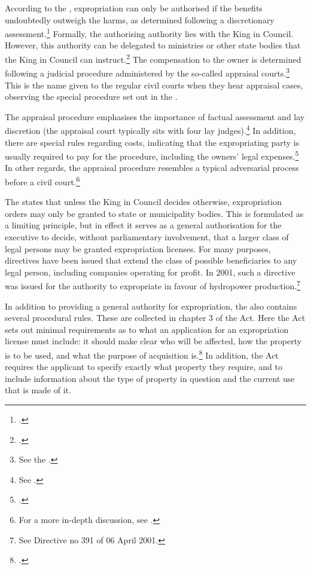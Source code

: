 According to the \cite{ea59}, expropriation can only be authorised if the benefits undoubtedly outweigh the harms, as determined following a discretionary assessment.\footnote{\dni\cite[2]{ea59}.} Formally, the authorising authority lies with the King in Council. However, this authority can be delegated to ministries or other state bodies that the King in Council can instruct.\footnote{\dni\cite[5]{ea59}.} The compensation to the owner is determined following a judicial procedure administered by the so-called appraisal courts.\footnote{See the \dni\cite[2]{ea59}.} This is the name given to the regular civil courts when they hear appraisal cases, observing the special procedure set out in the \cite{aa17}. 

The appraisal procedure emphasises the importance of factual assessment and lay discretion (the appraisal court typically sits with four lay judges).\footnote{See \dni\cite[11-12]{aa17}.} In addition, there are special rules regarding costs, indicating that the expropriating party is usually required to pay for the procedure, including the owners' legal expenses.\footnote{\dni\cite[54]{aa17}.} In other regards, the appraisal procedure resembles a typical adversarial process before a civil court.\footnote{For a more in-depth discussion, see \cite[382-384]{dyrkolbotn15b}.}

The \cite{ea59} states that unless the King in Council decides otherwise, expropriation orders may only be granted to state or municipality bodies. This is formulated as a limiting principle, but in effect it serves as a general authorisation for the executive to decide, without parliamentary involvement, that a larger class of legal persons may be granted expropriation licenses. For many purposes, directives have been issued that extend the class of possible beneficiaries to any legal person, including companies operating for profit. In 2001, such a directive was issued for the authority to expropriate in favour of hydropower production.\footnote{See Directive no 391 of 06 April 2001.} 

In addition to providing a general authority for expropriation, the \cite{ea59} also contains several procedural rules. These are collected in chapter 3 of the Act. Here the Act sets out minimal requirements as to what an application for an expropriation license must include: it should make clear who will be affected, how the property is to be used, and what the purpose of acquisition is.\footnote{\dni\cite[11]{ea59}.} In addition, the Act requires the applicant to specify exactly what property they require, and to include information about the type of property in question and the current use that is made of it.


